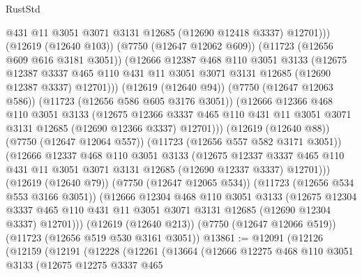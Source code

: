 \begin{lexlean}{RustStd}
\begin{coremodule}
                  @431
                  @11
                  @3051
                  @3071
                  @3131
                  @12685
                  (@12690 @12418 @3337)
                  @12701)))
            (@12619 (@12640 @103))
            (@7750 (@12647 @12062 @609))
            (@11723 (@12656 @609 @616 @3181 @3051))
            (@12666
              @12387
              @468
              @110
              @3051
              @3133
              (@12675
                @12387
                @3337
                @465
                @110
                @431
                @11
                @3051
                @3071
                @3131
                @12685
                (@12690 @12387 @3337)
                @12701)))
          (@12619 (@12640 @94))
          (@7750 (@12647 @12063 @586))
          (@11723 (@12656 @586 @605 @3176 @3051))
          (@12666
            @12366
            @468
            @110
            @3051
            @3133
            (@12675
              @12366
              @3337
              @465
              @110
              @431
              @11
              @3051
              @3071
              @3131
              @12685
              (@12690 @12366 @3337)
              @12701)))
        (@12619 (@12640 @88))
        (@7750 (@12647 @12064 @557))
        (@11723 (@12656 @557 @582 @3171 @3051))
        (@12666
          @12337
          @468
          @110
          @3051
          @3133
          (@12675
            @12337
            @3337
            @465
            @110
            @431
            @11
            @3051
            @3071
            @3131
            @12685
            (@12690 @12337 @3337)
            @12701)))
      (@12619 (@12640 @79))
      (@7750 (@12647 @12065 @534))
      (@11723 (@12656 @534 @553 @3166 @3051))
      (@12666
        @12304
        @468
        @110
        @3051
        @3133
        (@12675
          @12304
          @3337
          @465
          @110
          @431
          @11
          @3051
          @3071
          @3131
          @12685
          (@12690 @12304 @3337)
          @12701)))
    (@12619 (@12640 @213))
    (@7750 (@12647 @12066 @519))
    (@11723 (@12656 @519 @530 @3161 @3051))
@13861 := @12091
    (@12126
      (@12159
        (@12191
          (@12228
            (@12261
              (@13664
                (@12666
                  @12275
                  @468
                  @110
                  @3051
                  @3133
                  (@12675
                    @12275
                    @3337
                    @465

\end{coremodule}
\end{lexlean}
